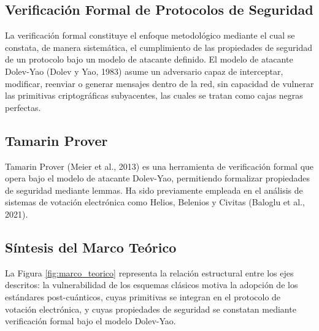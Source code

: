 \subsection{Verificación Formal de Protocolos de Seguridad}
La verificación formal constituye el enfoque metodológico mediante el cual se constata, de manera sistemática, el cumplimiento de las propiedades de seguridad de un protocolo bajo un modelo de atacante definido. El modelo de atacante Dolev-Yao (Dolev y Yao, 1983) asume un adversario capaz de interceptar, modificar, reenviar o generar mensajes dentro de la red, sin capacidad de vulnerar las primitivas criptográficas subyacentes, las cuales se tratan como cajas negras perfectas.

\subsection{Tamarin Prover}
Tamarin Prover (Meier et al., 2013) es una herramienta de verificación formal que opera bajo el modelo de atacante Dolev-Yao, permitiendo formalizar propiedades de seguridad mediante lemmas. Ha sido previamente empleada en el análisis de sistemas de votación electrónica como Helios, Belenios y Civitas (Baloglu et al., 2021).

\subsection{Síntesis del Marco Teórico}

La Figura \ref{fig:marco_teorico} representa la relación estructural entre los ejes descritos: la vulnerabilidad de los esquemas clásicos motiva la adopción de los estándares post-cuánticos, cuyas primitivas se integran en el protocolo de votación electrónica, y cuyas propiedades de seguridad se constatan mediante verificación formal bajo el modelo Dolev-Yao.
